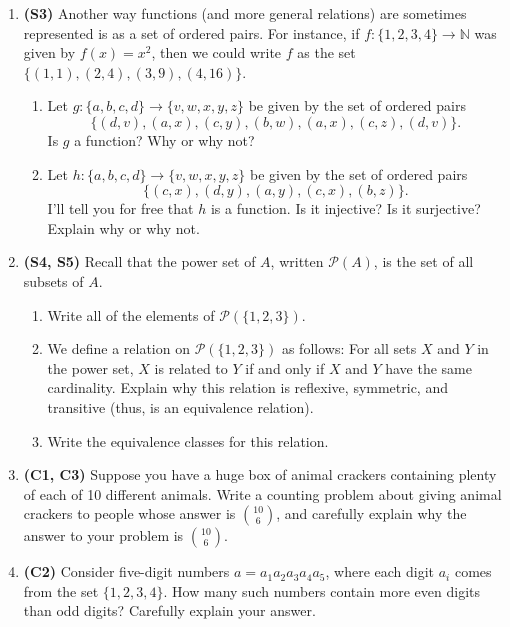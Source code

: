\documentclass[12pt]{article}
\begin{document}
\begin{enumerate}
\item \textbf{(S3)} Another way functions (and more general relations) are sometimes represented is as a set of ordered pairs. For instance, if $f:\{1,2,3,4\}\to\mathbb{N}$ was given by $f(x) = x^2$, then we could write $f$ as the set $\{(1,1), (2,4), (3,9), (4, 16)\}$.

\begin{enumerate}
\item Let $g:\{a,b,c,d\}\to\{v,w,x,y,z\}$  be given by the set of ordered pairs \[\{(d,v), (a,x), (c,y), (b,w), (a,x), (c,z), (d,v)\}.\] Is $g$ a function? Why or why not?
\item Let $h:\{a,b,c,d\}\to\{v,w,x,y,z\}$ be given by the set of ordered pairs \[\{(c,x),(d,y),(a,y),(c,x),(b,z)\}.\]
I'll tell you for free that $h$ is a function. Is it injective? Is it surjective? Explain why or why not.
\end{enumerate}

\item \textbf{(S4, S5)}  Recall that the power set of $A$, written $\mathcal{P}(A)$, is the set of all subsets of $A$.

\begin{enumerate}
    \item Write all of the elements of $\mathcal{P}(\{1,2,3\})$.
    \item We define a relation on $\mathcal{P}(\{1,2,3\})$ as follows: For all sets $X$ and $Y$ in the power set, $X$ is related to $Y$ if and only if $X$ and $Y$ have the same cardinality. Explain why this relation is reflexive, symmetric, and transitive (thus, is an equivalence relation).
    \item Write the equivalence classes for this relation.
    
\end{enumerate}

\item \textbf{(C1, C3)} Suppose you have a huge box of animal crackers containing plenty of each of 10 different animals. Write a counting problem about giving animal crackers to people whose answer is $\textstyle\binom{10}{6}$, and carefully explain why the answer to your problem is $\textstyle\binom{10}{6}$.

\item \textbf{(C2)} Consider five-digit numbers $a = a_1 a_2 a_3 a_4 a_5$, where each digit $a_i$ comes from the set $\{1,2,3,4\}$. How many such numbers contain more even digits than odd digits? Carefully explain your answer.


\end{enumerate}
\end{document}
